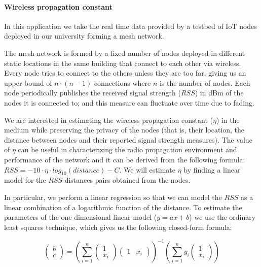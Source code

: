 \paragraph{Wireless propagation constant}

In this application we take the real time data provided by a testbed of IoT
nodes deployed in our university forming a mesh network.

The mesh network is formed by a fixed number of nodes deployed in different
static locations in the same building that connect to each other via wireless.
Every node tries to connect to the others unless they are too far, giving us an
upper bound of $n \cdot (n-1)$ connections where $n$ is the number of nodes.
Each node periodically publishes the received signal strength ($RSS$) in dBm of
the nodes it is connected to; and this measure can fluctuate over time due to
fading.

We are interested in estimating the wireless propagation constant ($\eta$) in
the medium while preserving the privacy of the nodes (that is, their location,
the distance between nodes and their reported signal strength measures).
The value of $\eta$ can be useful in characterizing the radio propagation
environment and performance of the network and it can be derived from the
following formula: \mbox{$RSS = -10 \cdot \eta \cdot log_{10}(distance) - C$}.
We will estimate $\eta$ by finding a linear model for the $RSS$-distances pairs
obtained from the nodes.

In particular, we perform a linear regression so that we can model the $RSS$ as
a linear combination of a logarithmic function of the distance.  To estimate
the parameters of the one dimensional linear model ($y = ax + b$) we use the
ordinary least squares technique, which gives us the following closed-form
formula:

\[
\begin{pmatrix} b \\ c \end{pmatrix} =
\left( \displaystyle\sum_{i=1}^n \begin{pmatrix} 1 \\ x_i \end{pmatrix}
  \begin{pmatrix} 1 & x_i\end{pmatrix}\right)^{-1}
\left( \displaystyle\sum_{i=1}^n y_i \begin{pmatrix} 1 \\ x_i \end{pmatrix}\right)
\]
\bigskip

